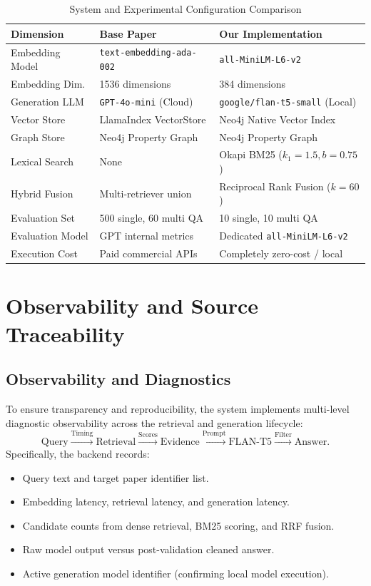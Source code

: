 \documentclass[conference]{IEEEtran}
\begin{document}
\begin{table}[t]
\caption{System and Experimental Configuration Comparison}
\label{tab:config}
\centering
\small
\begin{tabular}{p{2.1cm}p{2.8cm}p{2.8cm}}
\toprule
\textbf{Dimension} & \textbf{Base Paper \cite{ghanadian2026base}} & \textbf{Our Implementation} \\
\midrule
Embedding Model & \texttt{text-embedding-ada-002} & \texttt{all-MiniLM-L6-v2} \\
Embedding Dim. & 1536 dimensions & 384 dimensions \\
Generation LLM & \texttt{GPT-4o-mini} (Cloud) & \texttt{google/flan-t5-small} (Local) \\
Vector Store & LlamaIndex VectorStore & Neo4j Native Vector Index \\
Graph Store & Neo4j Property Graph & Neo4j Property Graph \\
Lexical Search & None & Okapi BM25 ($k_1=1.5, b=0.75$) \\
Hybrid Fusion & Multi-retriever union & Reciprocal Rank Fusion ($k=60$) \\
Evaluation Set & 500 single, 60 multi QA & 10 single, 10 multi QA \\
Evaluation Model & GPT internal metrics & Dedicated \texttt{all-MiniLM-L6-v2} \\
Execution Cost & Paid commercial APIs & Completely zero-cost / local \\
\bottomrule
\end{tabular}
\end{table}


\section{Observability and Source Traceability}

\subsection{Observability and Diagnostics}
To ensure transparency and reproducibility, the system implements multi-level diagnostic observability across the retrieval and generation lifecycle:
\begin{equation*}
\text{Query} \xrightarrow{\text{Timing}} \text{Retrieval} \xrightarrow{\text{Scores}} \text{Evidence} \xrightarrow{\text{Prompt}} \text{FLAN-T5} \xrightarrow{\text{Filter}} \text{Answer}.
\end{equation*}
Specifically, the backend records:
\begin{itemize}
\item Query text and target paper identifier list.
\item Embedding latency, retrieval latency, and generation latency.
\item Candidate counts from dense retrieval, BM25 scoring, and RRF fusion.
\item Raw model output versus post-validation cleaned answer.
\item Active generation model identifier (confirming local model execution).
\end{itemize}
\end{document}
